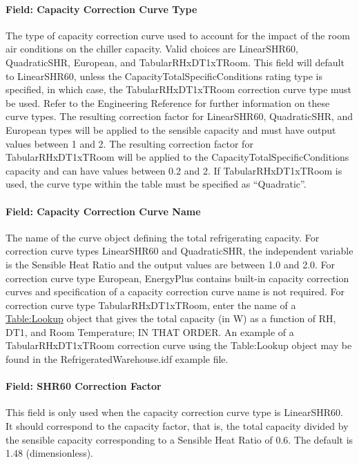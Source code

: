 \paragraph{Field: Capacity Correction Curve Type}\label{field-capacity-correction-curve-type}

The type of capacity correction curve used to account for the impact of the room air conditions on the chiller capacity. Valid choices are LinearSHR60, QuadraticSHR, European, and TabularRHxDT1xTRoom. This field will default to LinearSHR60, unless the CapacityTotalSpecificConditions rating type is specified, in which case, the TabularRHxDT1xTRoom correction curve type must be used. Refer to the Engineering Reference for further information on these curve types. The resulting correction factor for LinearSHR60, QuadraticSHR, and European types will be applied to the sensible capacity and must have output values between 1 and 2. The resulting correction factor for TabularRHxDT1xTRoom will be applied to the CapacityTotalSpecificConditions capacity and can have values between 0.2 and 2. If TabularRHxDT1xTRoom is used, the curve type within the table must be specified as ``Quadratic''.

\paragraph{Field: Capacity Correction Curve Name}\label{field-capacity-correction-curve-name}

The name of the curve object defining the total refrigerating capacity. For correction curve types LinearSHR60 and QuadraticSHR, the independent variable is the Sensible Heat Ratio and the output values are between 1.0 and 2.0. For correction curve type European, EnergyPlus contains built-in capacity correction curves and specification of a capacity correction curve name is not required. For correction curve type TabularRHxDT1xTRoom, enter the name of a \hyperref[tablelookup]{Table:Lookup} object that gives the total capacity (in W) as a function of RH, DT1, and Room Temperature; IN THAT ORDER. An example of a TabularRHxDT1xTRoom correction curve using the Table:Lookup object may be found in the RefrigeratedWarehouse.idf example file.

\paragraph{Field: SHR60 Correction Factor}\label{field-shr60-correction-factor}

This field is only used when the capacity correction curve type is LinearSHR60. It should correspond to the capacity factor, that is, the total capacity divided by the sensible capacity corresponding to a Sensible Heat Ratio of 0.6. The default is 1.48 (dimensionless).

